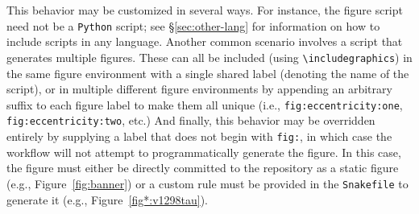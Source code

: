 \documentclass[twocolumn]{aastex631}
\begin{document}
This behavior may be customized in several ways. 
For instance, the figure script need not be a \texttt{Python} script; see \S\ref{sec:other-lang} for information on how to include scripts in any language.
Another common scenario involves a script that generates multiple figures. These can all be included (using \texttt{{\textbackslash}includegraphics}) in the same figure environment with a single shared label (denoting the name of the script), or in multiple different figure environments by appending an arbitrary suffix to each figure label to make them all unique (i.e., \texttt{fig:eccentricity:one}, \texttt{fig:eccentricity:two}, etc.)
And finally, this behavior may be overridden entirely by supplying a label that does not begin with \texttt{fig:}, in which case the workflow will not attempt to programmatically generate the figure.
In this case, the figure must either be directly committed to the repository as a static figure (e.g., Figure~\ref{fig:banner}) or a custom rule must be provided in the \texttt{Snakefile} to generate it (e.g., Figure~\ref{fig*:v1298tau}).
\end{document}
